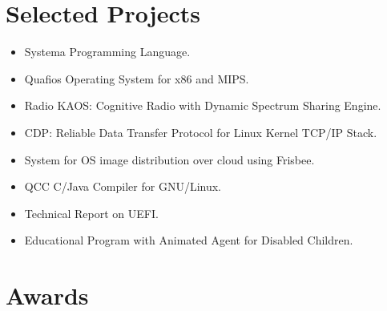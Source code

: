 \documentclass[letterpaper]{twentysecondcv} %
\begin{document}

\section{Selected Projects}

\begin{itemize}
    \item{Systema Programming Language.}
    \item{Quafios Operating System for x86 and MIPS.}
    \item{Radio KAOS: Cognitive Radio with Dynamic Spectrum Sharing Engine.}
    \item{CDP: Reliable Data Transfer Protocol for Linux Kernel TCP/IP Stack.}
    \item{System for OS image distribution over cloud using Frisbee.}
    \item{QCC C/Java Compiler for GNU/Linux.}
    \item{Technical Report on UEFI.}
    \item{Educational Program with Animated Agent for Disabled Children.}
\end{itemize}


\section{Awards}
\end{document}
